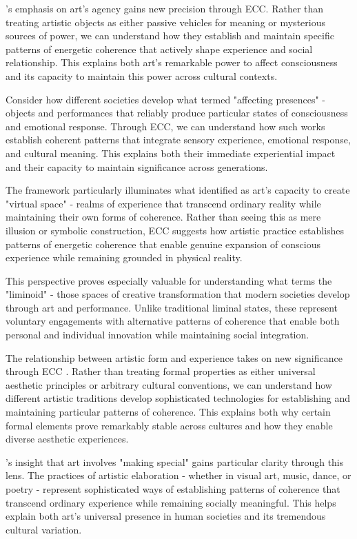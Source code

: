 \begin{refsection}
\cite{armstrong1971affecting}'s emphasis on art's agency gains new precision through ECC. Rather than treating artistic objects as either passive vehicles for meaning or mysterious sources of power, we can understand how they establish and maintain specific patterns of energetic coherence that actively shape experience and social relationship. This explains both art's remarkable power to affect consciousness and its capacity to maintain this power across cultural contexts.

Consider how different societies develop what \cite{armstrong1971affecting} termed "affecting presences" - objects and performances that reliably produce particular states of consciousness and emotional response. Through ECC, we can understand how such works establish coherent patterns that integrate sensory experience, emotional response, and cultural meaning. This explains both their immediate experiential impact and their capacity to maintain significance across generations.

The framework particularly illuminates what \cite{langer1953feeling} identified as art's capacity to create "virtual space" - realms of experience that transcend ordinary reality while maintaining their own forms of coherence. Rather than seeing this as mere illusion or symbolic construction, ECC suggests how artistic practice establishes patterns of energetic coherence that enable genuine expansion of conscious experience while remaining grounded in physical reality.

This perspective proves especially valuable for understanding what \cite{turner1982ritual} terms the "liminoid" - those spaces of creative transformation that modern societies develop through art and performance. Unlike traditional liminal states, these represent voluntary engagements with alternative patterns of coherence that enable both personal and individual innovation while maintaining social integration.

The relationship between artistic form and experience takes on new significance through ECC \cite{kaeppler1985structured}. Rather than treating formal properties as either universal aesthetic principles or arbitrary cultural conventions, we can understand how different artistic traditions develop sophisticated technologies for establishing and maintaining particular patterns of coherence. This explains both why certain formal elements prove remarkably stable across cultures and how they enable diverse aesthetic experiences.

\cite{dissanayake1992homo}'s insight that art involves "making special" gains particular clarity through this lens. The practices of artistic elaboration - whether in visual art, music, dance, or poetry - represent sophisticated ways of establishing patterns of coherence that transcend ordinary experience while remaining socially meaningful. This helps explain both art's universal presence in human societies and its tremendous cultural variation.


\end{refsection}
